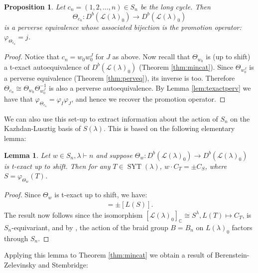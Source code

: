 \documentclass[11pt,reqno]{amsart}
\numberwithin{equation}{section}
\newtheorem{Proposition}[equation]{Proposition}
\newtheorem{Lemma}[equation]{Lemma}
\theoremstyle{definition}
\theoremstyle{named}
\newcommand{\cL}{\mathcal{L}}
\newcommand{\CC}{\mathbb{C}}
\DeclareMathOperator{\SYT}{SYT}
\begin{document}
\begin{Proposition}\label{prop:promo}
Let $c_n=(1,2,\hdots,n)\in S_n$ be the long cycle.  Then $$\Theta_{c_n}:D^b( \cL(\lambda)_0) \to D^b( \cL(\lambda)_0)$$ is a perverse equivalence whose associated bijection is the promotion operator: $\varphi_{\Theta_{c_n}}=j$.%
\end{Proposition}

\begin{proof}
Notice that $c_n=w_0w_0^J$ for $J$ as above. %
%
Now recall that $\Theta_{w_0}$ is (up to shift) a t-exact  autoequivalence of $D^b( \cL(\lambda)_0)$ (Theorem \ref{thm:mincat}).  Since $\Theta_{w_0^J}$ is a perverse equivalence (Theorem \ref{thm:perveq}),  its inverse is too.  Therefore $\Theta_{c_n}\cong\Theta_{w_0}\Theta_{w_0^J}^{-1}$ is also a perverse autoequivalence. 
By Lemma \ref{lem:texactperv} we have that $\varphi_{\Theta_{c_n}}=\varphi_I\varphi_J$, and hence we recover the promotion operator.
\end{proof}

We can also use this set-up to extract information about the action of $S_n$ on the Kazhdan-Lusztig basis of $S(\lambda)$.  This is based on the following elementary lemma:

\begin{Lemma}\label{lem:KLact}
Let $w \in S_n, \lambda \vdash n$ and suppose $\Theta_w :D^b(\cL(\lambda)_0) \to D^b(\cL(\lambda)_0)$ is t-exact up to shift. 
Then for any $T \in \SYT(\lambda)$, $w\cdot C_T=\pm C_{S}$, where $S=\varphi_{\Theta_w}(T)$.
\end{Lemma}

\begin{proof}
Since $\Theta_w$ is t-exact up to shift, we have: 
\begin{align*}
[\Theta_{w}(L(T))]=\pm [L(S)].
\end{align*}
The result now follows since the isomorphism $[\cL(\lambda)_0]_\CC \cong S^\lambda, L(T) \mapsto C_T$, is $S_n$-equivariant, and  by \cite[Proposition 10]{BauqWeyl}, the action of the braid group $B=B_n$ on $L(\lambda)_0$  factors through $S_n$.
\end{proof}

Applying this lemma to Theorem \ref{thm:mincat} we obtain a result of Berenstein-Zelevinsky and Stembridge:
\end{document}
